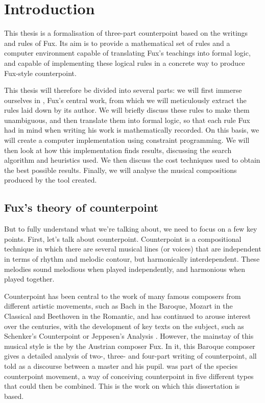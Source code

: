 \chapter{Introduction}
This thesis is a formalisation of three-part counterpoint based on the writings and rules of Fux. Its aim is to provide a mathematical set of rules and a computer environment capable of translating Fux's teachings into formal logic, and capable of implementing these logical rules in a concrete way to produce Fux-style counterpoint.


This thesis will therefore be divided into several parts: we will first immerse ourselves in \gap, Fux's central work, from which we will meticulously extract the rules laid down by its author. We will briefly discuss these rules to make them unambiguous, and then translate them into formal logic, so that each rule Fux had in mind when writing his work is mathematically recorded. On this basis, we will create a computer implementation using constraint programming. We will then look at how this implementation finds results, discussing the search algorithm and heuristics used. We then discuss the cost techniques used to obtain the best possible results. Finally, we will analyse the musical compositions produced by the tool created.

\section{Fux's theory of counterpoint}

But to fully understand what we're talking about, we need to focus on a few key points. First, let's talk about counterpoint. Counterpoint is a compositional technique in which there are several musical lines (or voices) that are independent in terms of rhythm and melodic contour, but harmonically interdependent. These melodies sound melodious when played independently, and harmonious when played together. 


Counterpoint has been central to the work of many famous composers from different artistic movements, such as Bach in the Baroque, Mozart in the Classical and Beethoven in the Romantic, and has continued to arouse interest over the centuries, with the development of key texts on the subject, such as Schenker's Counterpoint \cite{schenker1906} or Jeppesen's Analysis \cite{jeppesen1960}. However, the mainstay of this musical style is the \gaps  by the Austrian composer Fux. In it, this Baroque composer gives a detailed analysis of two-, three- and four-part writing of counterpoint, all told as a discourse between a master and his pupil. \gaps  was part of the species counterpoint movement, a way of conceiving counterpoint in five different types that could then be combined. This is the work on which this dissertation is based. 


